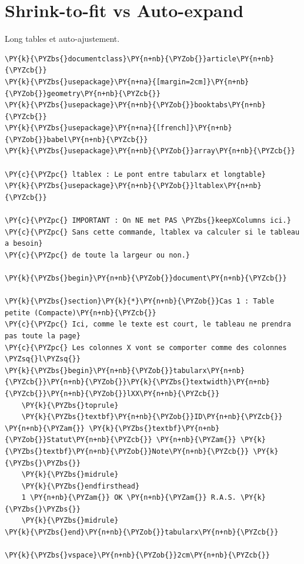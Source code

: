 \documentclass[a4paper,twoside]{article}
\begin{document}
\section{Shrink-to-fit vs Auto-expand}
Long tables et auto-ajustement.
\begin{tscode}[lang=latex, engine=pygments]
\begin{Verbatim}[commandchars=\\\{\},breaklines, breakanywhere, commandchars=\\\{\}]
\PY{k}{\PYZbs{}documentclass}\PY{n+nb}{\PYZob{}}article\PY{n+nb}{\PYZcb{}}
\PY{k}{\PYZbs{}usepackage}\PY{n+na}{[margin=2cm]}\PY{n+nb}{\PYZob{}}geometry\PY{n+nb}{\PYZcb{}}
\PY{k}{\PYZbs{}usepackage}\PY{n+nb}{\PYZob{}}booktabs\PY{n+nb}{\PYZcb{}}
\PY{k}{\PYZbs{}usepackage}\PY{n+na}{[french]}\PY{n+nb}{\PYZob{}}babel\PY{n+nb}{\PYZcb{}}
\PY{k}{\PYZbs{}usepackage}\PY{n+nb}{\PYZob{}}array\PY{n+nb}{\PYZcb{}}

\PY{c}{\PYZpc{} ltablex : Le pont entre tabularx et longtable}
\PY{k}{\PYZbs{}usepackage}\PY{n+nb}{\PYZob{}}ltablex\PY{n+nb}{\PYZcb{}}

\PY{c}{\PYZpc{} IMPORTANT : On NE met PAS \PYZbs{}keepXColumns ici.}
\PY{c}{\PYZpc{} Sans cette commande, ltablex va calculer si le tableau a besoin}
\PY{c}{\PYZpc{} de toute la largeur ou non.}

\PY{k}{\PYZbs{}begin}\PY{n+nb}{\PYZob{}}document\PY{n+nb}{\PYZcb{}}

\PY{k}{\PYZbs{}section}\PY{k}{*}\PY{n+nb}{\PYZob{}}Cas 1 : Table petite (Compacte)\PY{n+nb}{\PYZcb{}}
\PY{c}{\PYZpc{} Ici, comme le texte est court, le tableau ne prendra pas toute la page}
\PY{c}{\PYZpc{} Les colonnes X vont se comporter comme des colonnes \PYZsq{}l\PYZsq{}}
\PY{k}{\PYZbs{}begin}\PY{n+nb}{\PYZob{}}tabularx\PY{n+nb}{\PYZcb{}}\PY{n+nb}{\PYZob{}}\PY{k}{\PYZbs{}textwidth}\PY{n+nb}{\PYZcb{}}\PY{n+nb}{\PYZob{}}lXX\PY{n+nb}{\PYZcb{}}
    \PY{k}{\PYZbs{}toprule}
    \PY{k}{\PYZbs{}textbf}\PY{n+nb}{\PYZob{}}ID\PY{n+nb}{\PYZcb{}} \PY{n+nb}{\PYZam{}} \PY{k}{\PYZbs{}textbf}\PY{n+nb}{\PYZob{}}Statut\PY{n+nb}{\PYZcb{}} \PY{n+nb}{\PYZam{}} \PY{k}{\PYZbs{}textbf}\PY{n+nb}{\PYZob{}}Note\PY{n+nb}{\PYZcb{}} \PY{k}{\PYZbs{}\PYZbs{}}
    \PY{k}{\PYZbs{}midrule}
    \PY{k}{\PYZbs{}endfirsthead}
    1 \PY{n+nb}{\PYZam{}} OK \PY{n+nb}{\PYZam{}} R.A.S. \PY{k}{\PYZbs{}\PYZbs{}}
    \PY{k}{\PYZbs{}midrule}
\PY{k}{\PYZbs{}end}\PY{n+nb}{\PYZob{}}tabularx\PY{n+nb}{\PYZcb{}}

\PY{k}{\PYZbs{}vspace}\PY{n+nb}{\PYZob{}}2cm\PY{n+nb}{\PYZcb{}}


\end{Verbatim}
\end{tscode}
\end{document}
